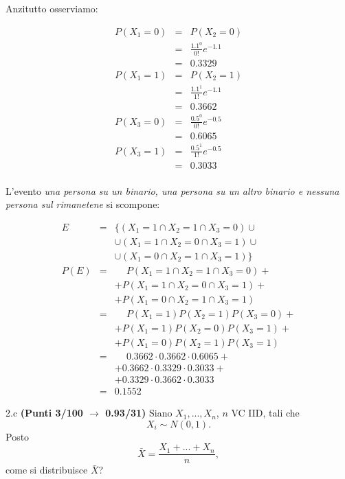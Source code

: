 \documentclass[
  11pt,
]{book}
\theoremstyle{mytheoremstyle}
\theoremstyle{mydefstyle}
\newenvironment{sol}
  {
  \begin{tcolorbox}[enhanced,breakable,arc=0.1mm,boxrule=1pt,colback=white,colframe=iblue,
  title=\bf \fontfamily{lmss}\selectfont \hspace{.5 cm} Soluzione,drop fuzzy shadow]

}{
\end{tcolorbox}
  }
\begin{document}
\begin{sol}
Anzitutto osserviamo:

\begin{eqnarray*}
P(X_1= 0) &=& P(X_2=0)\\
          &=& \frac{1.1^0}{0!}e^{-1.1}\\
          &=& 0.3329\\
P(X_1= 1) &=& P(X_2=1)\\
          &=& \frac{1.1^1}{1!}e^{-1.1}\\
          &=& 0.3662\\
P(X_3= 0) &=& \frac{0.5^0}{0!}e^{-0.5}\\
          &=& 0.6065\\
P(X_3= 1) &=& \frac{0.5^1}{1!}e^{-0.5}\\
          &=& 0.3033\\
\end{eqnarray*}

L'evento \emph{una persona su un binario, una persona su un altro binario e nessuna persona sul rimanetene}
si scompone:

\begin{eqnarray*}
E &=& \big\{(X_1=1\cap X_2=1\cap X_3=0)\cup\\
   &&\cup(X_1=1\cap X_2=0\cap X_3=1)\cup\\
   &&\cup(X_1=0\cap X_2=1\cap X_3=1)\big\}\\
P(E) &=& \phantom{+} P(X_1=1\cap X_2=1\cap X_3=0)+\\
     && + P(X_1=1\cap X_2=0\cap X_3=1)+\\
     && + P(X_1=0\cap X_2=1\cap X_3=1)\\
     &=& \phantom{+} P(X_1=1)P(X_2=1)P(X_3=0)+\\
     && + P(X_1=1)P(X_2=0)P(X_3=1)+\\
     && + P(X_1=0)P(X_2=1)P(X_3=1)\\
     &=& \phantom{+} 0.3662\cdot0.3662\cdot0.6065+\\
     && +0.3662\cdot0.3329\cdot0.3033+\\
     && +0.3329\cdot0.3662\cdot0.3033\\
     &=& 0.1552
\end{eqnarray*}

\end{sol}

2.c \textbf{(Punti 3/100 \(\rightarrow\) 0.93/31)} Siano \(X_1,...,X_n\), \(n\) VC IID, tali che
\[
X_i\sim N(0,1).
\]
Posto
\[
\bar X = \frac{X_1+...+X_n}{n},
\]
come si distribuisce \(\bar X\)?
\end{document}

